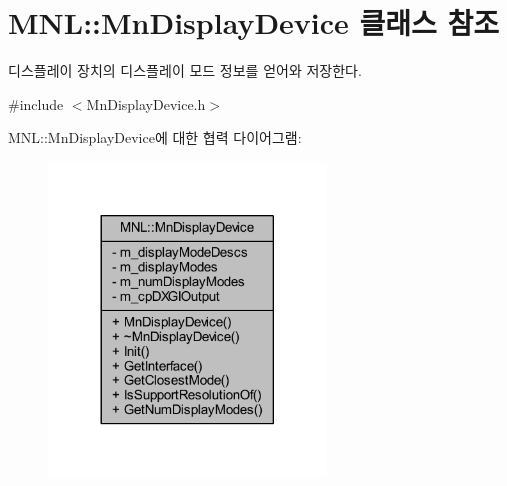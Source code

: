 \hypertarget{class_m_n_l_1_1_mn_display_device}{}\section{M\+NL\+:\+:Mn\+Display\+Device 클래스 참조}
\label{class_m_n_l_1_1_mn_display_device}


디스플레이 장치의 디스플레이 모드 정보를 얻어와 저장한다.  




{\ttfamily \#include $<$Mn\+Display\+Device.\+h$>$}



M\+NL\+:\+:Mn\+Display\+Device에 대한 협력 다이어그램\+:\nopagebreak
\begin{figure}[H]
\begin{center}
\leavevmode
\includegraphics[width=209pt]{class_m_n_l_1_1_mn_display_device__coll__graph}
\end{center}
\end{figure}
